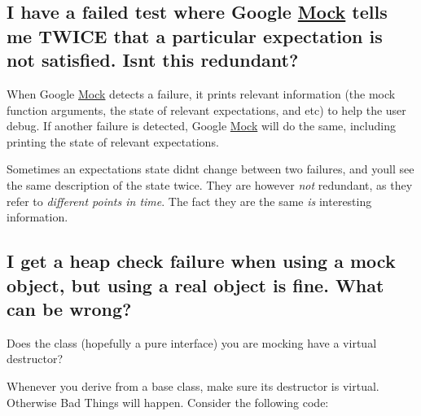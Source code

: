 \begin{DoxyCode}{0}
\end{DoxyCode}


\subsection*{I have a failed test where Google \mbox{\hyperlink{class_mock}{Mock}} tells me T\+W\+I\+CE that a particular expectation is not satisfied. Isn\textquotesingle{}t this redundant?}

When Google \mbox{\hyperlink{class_mock}{Mock}} detects a failure, it prints relevant information (the mock function arguments, the state of relevant expectations, and etc) to help the user debug. If another failure is detected, Google \mbox{\hyperlink{class_mock}{Mock}} will do the same, including printing the state of relevant expectations.

Sometimes an expectation\textquotesingle{}s state didn\textquotesingle{}t change between two failures, and you\textquotesingle{}ll see the same description of the state twice. They are however {\itshape not} redundant, as they refer to {\itshape different points in time}. The fact they are the same {\itshape is} interesting information.

\subsection*{I get a heap check failure when using a mock object, but using a real object is fine. What can be wrong?}

Does the class (hopefully a pure interface) you are mocking have a virtual destructor?

Whenever you derive from a base class, make sure its destructor is virtual. Otherwise Bad Things will happen. Consider the following code\+:


\begin{DoxyCode}{0}
\DoxyCodeLine{\};}
\DoxyCodeLine{}
\DoxyCodeLine{\};}
\DoxyCodeLine{}
\end{DoxyCode}


